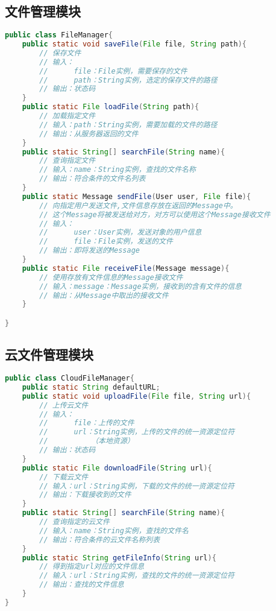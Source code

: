 \subsection{\color{red}文件管理模块}
\begin{lstlisting}[language=Java, caption=文件管理模块接口]
public class FileManager{
    public static void saveFile(File file, String path){
        // 保存文件
        // 输入：
        //      file：File实例，需要保存的文件
        //      path：String实例，选定的保存文件的路径
        // 输出：状态码
    }
    public static File loadFile(String path){
        // 加载指定文件
        // 输入：path：String实例，需要加载的文件的路径
        // 输出：从服务器返回的文件
    }
    public static String[] searchFile(String name){
        // 查询指定文件
        // 输入：name：String实例，查找的文件名称
        // 输出：符合条件的文件名列表
    }
    public static Message sendFile(User user, File file){
        // 向指定用户发送文件,文件信息存放在返回的Message中。
        // 这个Message将被发送给对方，对方可以使用这个Message接收文件
        // 输入：
        //      user：User实例，发送对象的用户信息
        //      file：File实例，发送的文件
        // 输出：即将发送的Message
    }
    public static File receiveFile(Message message){
        // 使用存放有文件信息的Message接收文件
        // 输入：message：Message实例，接收到的含有文件的信息
        // 输出：从Message中取出的接收文件
    }

}
\end{lstlisting}

\subsection{\color{red}云文件管理模块}
\begin{lstlisting}[language=Java, caption=云文件管理模块接口]
public class CloudFileManager{
    public static String defaultURL;
    public static void uploadFile(File file, String url){
        // 上传云文件
        // 输入：
        //      file：上传的文件
        //      url：String实例，上传的文件的统一资源定位符
        //          （本地资源）
        // 输出：状态码
    }
    public static File downloadFile(String url){
        // 下载云文件
        // 输入：url：String实例，下载的文件的统一资源定位符
        // 输出：下载接收到的文件
    }
    public static String[] searchFile(String name){
        // 查询指定的云文件
        // 输入：name：String实例，查找的文件名
        // 输出：符合条件的云文件名称列表
    }
    public static String getFileInfo(String url){
        // 得到指定url对应的文件信息
        // 输入：url：String实例，查找的文件的统一资源定位符
        // 输出：查找的文件信息
    }
}
\end{lstlisting}

